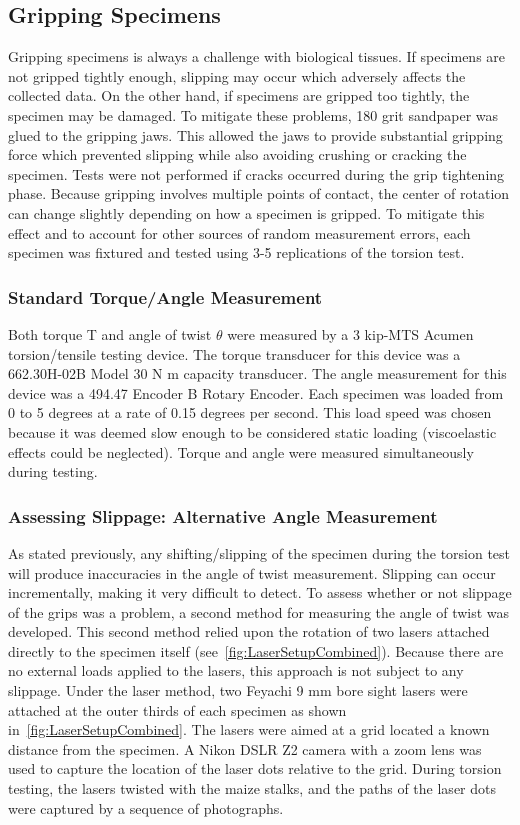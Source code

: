 \subsection{Gripping Specimens}
\label{ssec:gripping_specimens}
Gripping specimens is always a challenge with biological tissues. If specimens are not gripped tightly enough, slipping may occur which adversely affects the collected data. On the other hand, if specimens are gripped too tightly, the specimen may be damaged. To mitigate these problems, 180 grit sandpaper was glued to the gripping jaws. This allowed the jaws to provide substantial gripping force which prevented slipping while also avoiding crushing or cracking the specimen. Tests were not performed if cracks occurred during the grip tightening phase. Because gripping involves multiple points of contact, the center of rotation can change slightly depending on how a specimen is gripped. To mitigate this effect and to account for other sources of random measurement errors, each specimen was fixtured and tested using 3-5 replications of the torsion test. 

\subsubsection{Standard Torque/Angle Measurement}
\label{ssec:torque_angle_measurement}
Both torque T and angle of twist ${\theta}$ were measured by a 3 kip-MTS Acumen torsion/tensile testing device. The torque transducer for this device was a 662.30H-02B Model 30 N m capacity transducer. The angle measurement for this device was a 494.47 Encoder B Rotary Encoder. Each specimen was loaded from 0 to 5 degrees at a rate of 0.15 degrees per second. This load speed was chosen because it was deemed slow enough to be considered static loading (viscoelastic effects could be neglected). Torque and angle were measured simultaneously during testing.		

\subsubsection{Assessing Slippage: Alternative Angle Measurement}
\label{ssec:alternative_angle_measurement}
As stated previously, any shifting/slipping of the specimen during the torsion test will produce inaccuracies in the angle of twist measurement. Slipping can occur incrementally, making it very difficult to detect. To assess whether or not slippage of the grips was a problem, a second method for measuring the angle of twist was developed. This second method relied upon the rotation of two lasers attached directly to the specimen itself (see~\cref{fig:LaserSetupCombined}). Because there are no external loads applied to the lasers, this approach is not subject to any slippage.
Under the laser method, two Feyachi 9 mm bore sight lasers were attached at the outer thirds of each specimen as shown in~\cref{fig:LaserSetupCombined}. The lasers were aimed at a grid located a known distance from the specimen. A Nikon DSLR Z2 camera with a zoom lens was used to capture the location of the laser dots relative to the grid. During torsion testing, the lasers twisted with the maize stalks, and the paths of the laser dots were captured by a sequence of photographs.

